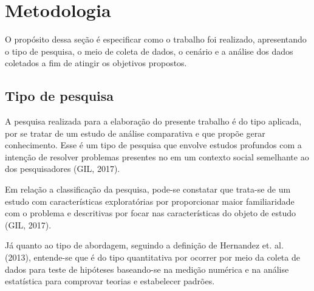 \chapter{Metodologia}
\label{chap:metodologia}

O propósito dessa seção é especificar como o trabalho foi realizado, apresentando o tipo de pesquisa, o meio de coleta de dados, o cenário e a análise dos dados coletados a fim de atingir os objetivos propostos.

\section{Tipo de pesquisa}
\label{sec:tipo-de-pesquisa}

A pesquisa realizada para a elaboração do presente trabalho é do tipo aplicada, por se tratar de um estudo de análise comparativa e que propõe gerar conhecimento. Esse é um tipo de pesquisa que envolve estudos profundos com a intenção de resolver problemas presentes no em um contexto social semelhante ao dos pesquisadores (GIL, 2017)\nocite{pesquisa}.

Em relação a classificação da pesquisa, pode-se constatar que trata-se de um estudo com características exploratórias por proporcionar maior familiaridade com o problema e descritivas por focar nas características do objeto de estudo (GIL, 2017).

Já quanto ao tipo de abordagem, seguindo a definição de Hernandez et. al. (2013)\nocite{hernandez2013}, entende-se que é do tipo quantitativa por ocorrer por meio da coleta de dados para teste de hipóteses baseando-se na medição numérica e na análise estatística para comprovar teorias e estabelecer padrões. 